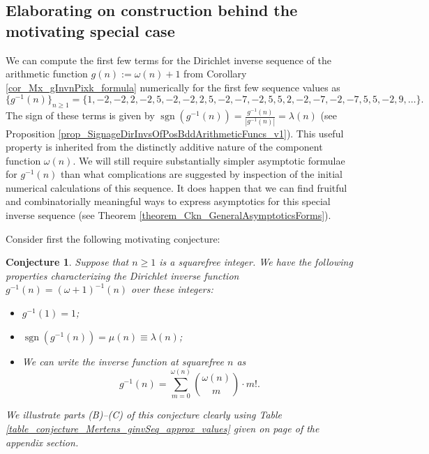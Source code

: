 \documentclass[11pt,reqno,a4letter]{article}
\numberwithin{figure}{section}
\numberwithin{table}{section}
\theoremstyle{plain}
\newtheorem{conjecture}[theorem]{Conjecture}
\numberwithin{theorem}{section}
\theoremstyle{definition}
\newcommand{\NBRef}[1]{}
\begin{document}
\subsection{Elaborating on construction behind the motivating special case} 
\label{example_InvertingARecRelForMx_Intro}

We can compute the first few terms for the
Dirichlet inverse sequence of the arithmetic function 
$g(n) := \omega(n) + 1$ from 
Corollary \ref{cor_Mx_gInvnPixk_formula} 
numerically for the first few sequence values as 
\[
\{g^{-1}(n)\}_{n \geq 1} = \{1, -2, -2, 2, -2, 5, -2, -2, 2, 5, -2, -7, -2, 5, 5, 2, -2, -7, -2, 
     -7, 5, 5, -2, 9, \ldots \}. 
\] 
The sign of these terms is given by $\operatorname{sgn}(g^{-1}(n)) = \frac{g^{-1}(n)}{|g^{-1}(n)|} = \lambda(n)$ 
(see Proposition \ref{prop_SignageDirInvsOfPosBddArithmeticFuncs_v1}). 
This useful property is inherited from the distinctly 
additive nature of the component function $\omega(n)$. 
We will still require substantially simpler asymptotic formulae for $g^{-1}(n)$ than what 
complications are suggested by inspection of the initial 
numerical calculations of this sequence. 
It does happen that we can find fruitful and combinatorially meaningful 
ways to express asymptotics for this special inverse sequence 
(see Theorem \ref{theorem_Ckn_GeneralAsymptoticsForms}). 

Consider first the following motivating conjecture: 
\NBRef{A01-2020-04-26}

\begin{conjecture}
\label{lemma_gInv_MxExample} 
Suppose that $n \geq 1$ is a squarefree integer. We have the following properties characterizing the 
Dirichlet inverse function $g^{-1}(n) = (\omega+1)^{-1}(n)$ over these integers: 
\begin{itemize} 

\item[(A)] $g^{-1}(1) = 1$; 
\item[(B)] $\operatorname{sgn}(g^{-1}(n)) = \mu(n) \equiv \lambda(n)$; 
\item[(C)] We can write the inverse function at squarefree $n$ as 
     \[
     g^{-1}(n) = \sum_{m=0}^{\omega(n)} \binom{\omega(n)}{m} \cdot m!. 
     \]
\end{itemize} 
We illustrate parts (B)--(C) of this conjecture clearly using 
Table \ref{table_conjecture_Mertens_ginvSeq_approx_values} given on 
page \pageref{table_conjecture_Mertens_ginvSeq_approx_values} of the appendix section. 
\end{conjecture} 
\end{document}
